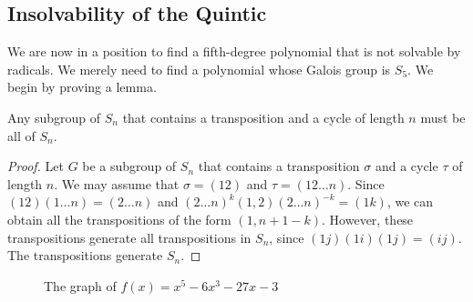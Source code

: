  
 	   
\subsection*{Insolvability of the Quintic}
 

We are now in a position to find a fifth-degree polynomial that is not
solvable by radicals.  We merely need to find a polynomial whose
Galois group is $S_5$. We begin by proving a lemma.

 
\begin{lemma}\label{galois:Sn_generating_lemma}
Any subgroup of $S_n$ that contains a transposition and a cycle of length
$n$ must be all of $S_n$. 
\end{lemma}
 
 
\begin{proof}
Let $G$ be a subgroup of $S_n$ that contains a transposition $\sigma$
and a cycle $\tau$ of length $n$.  We may assume that $\sigma = (1 2)$
and $\tau = (1 2 \ldots n)$. Since $(1 2)(1 \ldots n) = (2 \ldots n)$
and $(2 \ldots n)^{k}(1,2)(2 \ldots n)^{-k} = (1k)$, we can obtain all
the transpositions of the form $(1,n+1-k)$. However, these
transpositions generate all transpositions in $S_n$, since $(1j)(1 i)(1
j) = (i j)$.  The transpositions generate $S_n$. 
\end{proof}
 
 
\medskip
\begin{figure}
\begin{center}


\end{center}
\caption{The graph of $f(x) = x^5 - 6 x^3 - 27 x - 3$}
\label{Galois4}
\end{figure}

